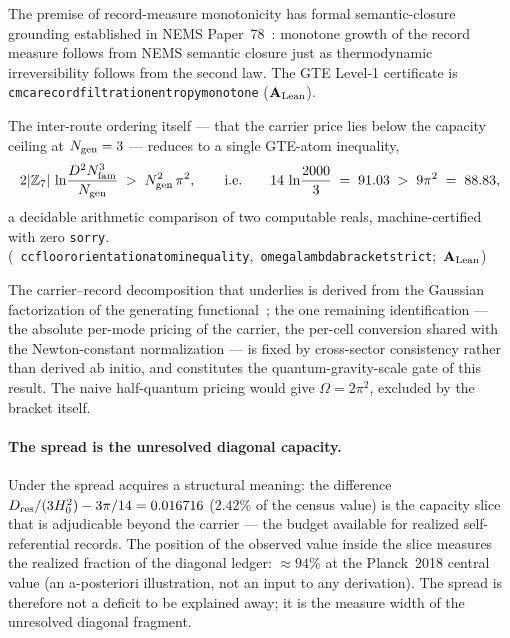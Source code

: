 \documentclass[11pt]{article}
\theoremstyle{remark}
\newcommand{\ZS}{\mathbb{Z}_7}
\newcommand{\lean}[1]{%
  \penalty-100
  \begingroup\def\_{\textunderscore\allowbreak}\texttt{#1}\endgroup}
\newcommand{\Hnought}{H_0}
\newcommand{\Dres}{D_{\rm res}}
\newcommand{\CatAL}{\ensuremath{\textbf{A}_{\rm Lean}}}
\begin{document}
The premise of record-measure monotonicity has formal semantic-closure grounding
established in NEMS Paper~78~\cite{SpivackNEMS78}: monotone growth of the
record measure follows from NEMS semantic closure just as thermodynamic
irreversibility follows from the second law.
The GTE Level-1 certificate is
\lean{cmca\_record\_filtration\_entropy\_monotone} (\CatAL).

The inter-route ordering itself --- that the carrier price lies below the
capacity ceiling at $N_{\rm gen}=3$ --- reduces to a single GTE-atom inequality,
\begin{equation}
  2|\ZS|\,\ln\!\frac{D^2 N_{\rm fam}^3}{N_{\rm gen}}
  \;>\; N_{\rm gen}^2\,\pi^2,
  \qquad\text{i.e.}\qquad
  14\,\ln\!\frac{2000}{3} \;=\; 91.03 \;>\; 9\pi^2 \;=\; 88.83,
  \label{eq:atomineq}
\end{equation}
a decidable arithmetic comparison of two computable reals, machine-certified
with zero \texttt{sorry}.\\
\mbox{(\lean{cc\_floor\_orientation\_atom\_inequality},
\lean{omega\_lambda\_bracket\_strict}; \CatAL)}

The carrier--record decomposition that underlies  is derived
from the Gaussian factorization of the generating
functional~\cite{SpivackGTEPolynomialUFT}; the one remaining identification ---
the absolute per-mode pricing of the carrier, the per-cell conversion shared
with the Newton-constant normalization --- is fixed by cross-sector consistency
rather than derived ab initio, and constitutes the quantum-gravity-scale gate
of this result. The naive half-quantum pricing would give $\Omega = 2\pi^2$,
excluded by the bracket itself.

\paragraph{The spread is the unresolved diagonal capacity.}
Under  the spread acquires a structural meaning: the
difference $\Dres/(3\Hnought^2) - 3\pi/14 = 0.016716$ ($2.42\%$ of the census
value) is the capacity slice that is adjudicable beyond the carrier --- the
budget available for realized self-referential records. The position of the
observed value inside the slice measures the realized fraction of the diagonal
ledger: $\approx 94\%$ at the Planck~2018 central value (an a-posteriori
illustration, not an input to any derivation). The spread is therefore not a
deficit to be explained away; it is the measure width of the unresolved
diagonal fragment.
\end{document}
